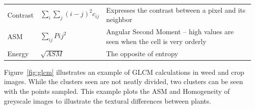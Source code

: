 \documentclass[letterpaper, notitlepage]{report}
\begin{document}
\begin{longtable}{x{\dimexpr.15\tabcolsep}
                  x{\dimexpr.225\tabcolsep}
                  x{\dimexpr.625\tabcolsep}}
		Contrast      
		& $\sum_{i}\sum_{j}{(i - j)}^2 c_{ij}$ 
		& Expresses the contrast between a pixel and its neighbor
\tabularnewline\addlinespace

		ASM      
		& $\sum_{ij}P{ij}^2$
		& Angular Second Moment -- high values are seen when the cell is very orderly
\tabularnewline\addlinespace

		Energy   
		& $\sqrt{ASM}$ 
		& The opposite of entropy
\label{table:glcm-formulae}
\end{longtable}

Figure~\ref{fig:glcm} illustrates an example of GLCM calculations in weed and crop images. While the clusters seen are not neatly divided, two clusters can be seen with the points sampled. This example plots the ASM and Homogeneity of greyscale images to illustrate the textural differences between plants.
\end{document}
